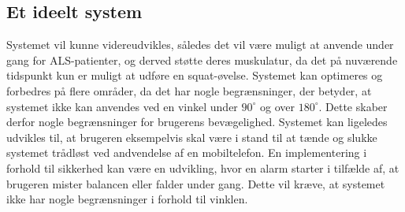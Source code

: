 \subsection{Et ideelt system}
Systemet vil kunne videreudvikles, således det vil være muligt at anvende under gang for ALS-patienter, og derved støtte deres muskulatur, da det på nuværende tidspunkt kun er muligt at udføre en squat-øvelse. Systemet kan optimeres og forbedres på flere områder, da det har nogle begrænsninger, der betyder, at systemet ikke kan anvendes ved en vinkel under $90^{\circ}$ og over $180^{\circ}$. Dette skaber derfor nogle begrænsninger for brugerens bevægelighed. Systemet kan ligeledes udvikles til, at brugeren eksempelvis skal være i stand til at tænde og slukke systemet trådløst ved andvendelse af en mobiltelefon. En implementering i forhold til sikkerhed kan være en udvikling, hvor en alarm starter i tilfælde af, at brugeren mister balancen eller falder under gang. Dette vil kræve, at systemet ikke har nogle begrænsninger i forhold til vinklen. 




